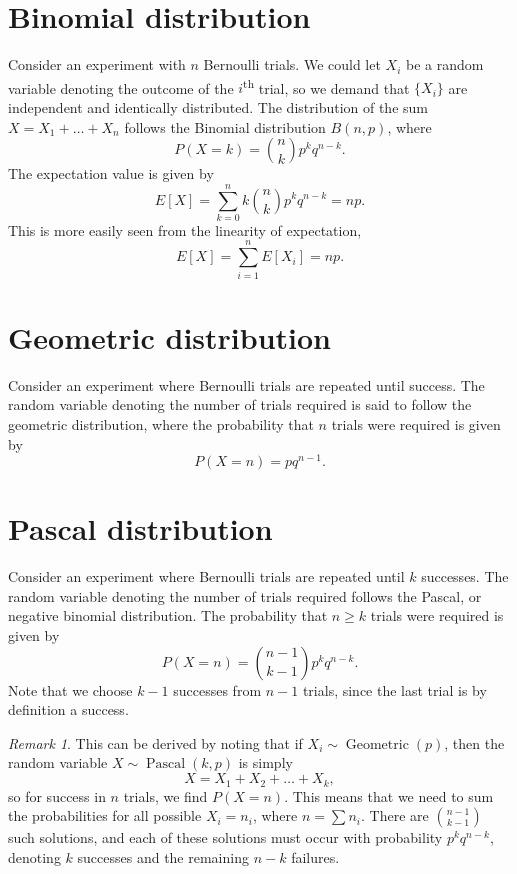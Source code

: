 \documentclass[11pt]{article}
\newcommand\E[1]{E\left[#1\right]}
\theoremstyle{definition}
\theoremstyle{remark}
\newtheorem*{remark}{Remark}
\numberwithin{equation}{module}
\begin{document}
    \section*{Binomial distribution}
    Consider an experiment with $n$ Bernoulli trials. We could let $X_i$ be a
    random variable denoting the outcome of the $i$\textsuperscript{th} trial, so
    we demand that $\{X_i\}$ are independent and identically distributed.
    The distribution of the sum $X = X_1 + \dots + X_n$ follows the Binomial
    distribution $B(n, p)$, where \[
        P(X = k) = \binom{n}{k}p^kq^{n-k}.
    \] The expectation value is given by \[
        \E{X} = \sum_{k = 0}^n k\binom{n}{k}p^kq^{n - k} = np.
    \] This is more easily seen from the linearity of expectation, \[
        \E{X} = \sum_{i = 1}^n \E{X_i} = np.
    \] 

    \section*{Geometric distribution}
    Consider an experiment where Bernoulli trials are repeated until success. The
    random variable denoting the number of trials required is said to follow the
    geometric distribution, where the probability that $n$ trials were required is
    given by \[
        P(X = n) = pq^{n - 1}.
    \] 

    \section*{Pascal distribution}
    Consider an experiment where Bernoulli trials are repeated until $k$ successes.
    The random variable denoting the number of trials required follows the Pascal,
    or negative binomial distribution. The probability that $n \geq k$ trials were
    required is given by \[
        P(X = n) = \binom{n - 1}{k - 1}p^k q^{n - k}.
    \] Note that we choose $k - 1$ successes from $n - 1$ trials, since the last
    trial is by definition a success.

    \begin{remark}
        This can be derived by noting that if $X_i \sim
        \operatorname{Geometric}(p)$, then the random variable $X \sim
        \operatorname{Pascal}(k, p)$ is simply \[
            X = X_1 + X_2 + \dots + X_k,
        \] so for success in $n$ trials, we find $P(X = n)$. This means that we need
        to sum the probabilities for all possible $X_i = n_i$, where $n = \sum n_i$.
        There are $\binom{n - 1}{k - 1}$ such solutions, and each of these solutions
        must occur with probability $p^k q^{n - k}$, denoting $k$ successes and the
        remaining $n - k$ failures.
    \end{remark}
\end{document}
